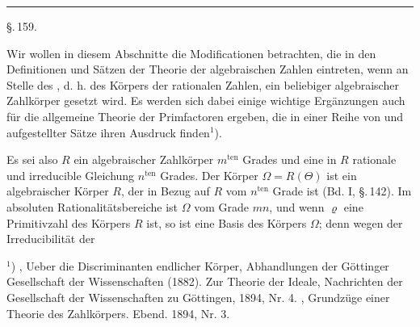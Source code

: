 \begin{center}


\rule{0.2\linewidth}{0.4pt}

\S.\,159.

\end{center}

Wir wollen in diesem Abschnitte die Modificationen betrachten, die in den Definitionen und S\"atzen der Theorie der algebraischen Zahlen eintreten, wenn an Stelle des , d. h. des K\"orpers der rationalen Zahlen, ein beliebiger algebraischer Zahlk\"orper gesetzt wird. Es werden sich dabei einige wichtige Erg\"anzungen auch f\"ur die allgemeine Theorie der Primfactoren ergeben, die in einer Reihe von  und  aufgestellter S\"atze ihren Ausdruck finden${}^{1}$).

Es sei also $R$ ein algebraischer Zahlk\"orper $m^{\text{ten}}$ Grades und
eine in $R$ rationale und irreducible Gleichung $n^{\text{ten}}$ Grades. Der K\"orper $\Omega = R(\Theta)$ ist ein algebraischer K\"orper  $R$, der in Bezug auf $R$ vom $n^{\text{ten}}$ Grade ist (Bd. I, \S.\,142). Im absoluten Rationalit\"atsbereiche ist $\Omega$ vom Grade $mn$, und wenn $\varrho$ eine Primitivzahl des K\"orpers $R$ ist, so ist
eine Basis des K\"orpers $\Omega$; denn wegen der Irreducibilit\"at der

${}^{1}$) , \glqq Ueber die Discriminanten endlicher K\"orper\grqq{}, Abhandlungen der G\"ottinger Gesellschaft der Wissenschaften (1882). \glqq Zur Theorie der Ideale\grqq{}, Nachrichten der Gesellschaft der Wissenschaften zu G\"ottingen, 1894, Nr. 4. , \glqq Grundz\"uge einer Theorie des  Zahlk\"orpers\grqq{}. Ebend. 1894, Nr. 3.
